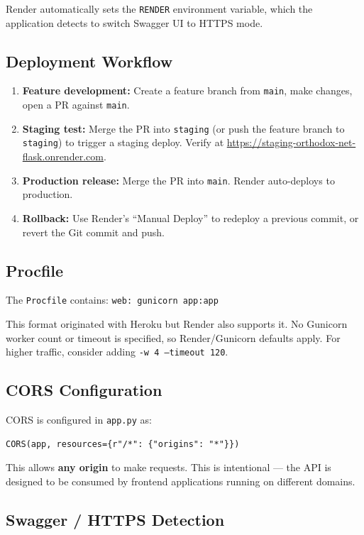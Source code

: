 \documentclass[12pt]{article}
\begin{document}
Render automatically sets the \texttt{RENDER} environment variable, which the application detects to switch Swagger UI to HTTPS mode.

\subsection{Deployment Workflow}

\begin{enumerate}
    \item \textbf{Feature development:} Create a feature branch from \texttt{main}, make changes, open a PR against \texttt{main}.
    \item \textbf{Staging test:} Merge the PR into \texttt{staging} (or push the feature branch to \texttt{staging}) to trigger a staging deploy. Verify at \url{https://staging-orthodox-net-flask.onrender.com}.
    \item \textbf{Production release:} Merge the PR into \texttt{main}. Render auto-deploys to production.
    \item \textbf{Rollback:} Use Render's ``Manual Deploy'' to redeploy a previous commit, or revert the Git commit and push.
\end{enumerate}

\subsection{Procfile}

The \texttt{Procfile} contains: \texttt{web: gunicorn app:app}

This format originated with Heroku but Render also supports it. No Gunicorn worker count or timeout is specified, so Render/Gunicorn defaults apply. For higher traffic, consider adding \texttt{-w 4 --timeout 120}.

\subsection{CORS Configuration}

CORS is configured in \texttt{app.py} as:
\begin{lstlisting}[basicstyle=\ttfamily\footnotesize]
CORS(app, resources={r"/*": {"origins": "*"}})
\end{lstlisting}
This allows \textbf{any origin} to make requests. This is intentional --- the API is designed to be consumed by frontend applications running on different domains.

\subsection{Swagger / HTTPS Detection}
\end{document}

